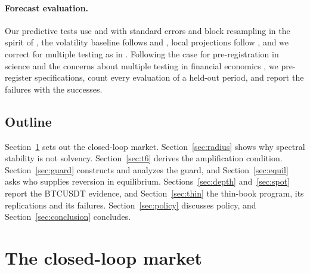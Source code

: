 \documentclass[12pt]{article}
\theoremstyle{definition}
\theoremstyle{remark}
\begin{document}
\paragraph{Forecast evaluation.} Our predictive tests use \citet{clark2007} and \citet{diebold1995} with \citet{newey1987} standard errors and block resampling in the spirit of \citet{kunsch1989}, the volatility baseline follows \citet{corsi2009} and \citet{riskmetrics1996}, local projections follow \citet{jorda2005}, and we correct for multiple testing as in \citet{holm1979}. Following the case for pre-registration in science \citep{nosek2018} and the concerns about multiple testing in financial economics \citep{harvey2016,harvey2017}, we pre-register specifications, count every evaluation of a held-out period, and report the failures with the successes.

\subsection{Outline}
Section~\ref{sec:model} sets out the closed-loop market. Section~\ref{sec:radius} shows why spectral stability is not solvency. Section~\ref{sec:t6} derives the amplification condition. Section~\ref{sec:guard} constructs and analyzes the guard, and Section~\ref{sec:equil} asks who supplies reversion in equilibrium. Sections~\ref{sec:depth} and~\ref{sec:spot} report the BTCUSDT evidence, and Section~\ref{sec:thin} the thin-book program, its replications and its failures. Section~\ref{sec:policy} discusses policy, and Section~\ref{sec:conclusion} concludes.
\section{The closed-loop market}\label{sec:model}
\end{document}

